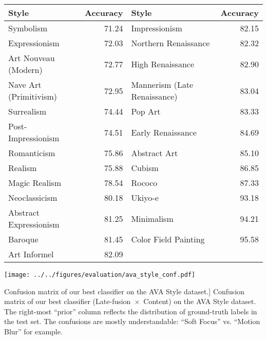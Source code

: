 \begin{table*}
\caption{
    Per-class accuracies on the Wikipaintings dataset, using the MC-bit feature.
}\label{tab:wp_accuracies}
\vspace{1em}
\centering
\begin{tabular}{lrlr}
\toprule
\textbf{Style} & \textbf{Accuracy} & \textbf{Style} & \textbf{Accuracy} \\
\midrule
Symbolism                    &         71.24 & Impressionism                &         82.15 \\
Expressionism                &         72.03 & Northern Renaissance         &         82.32 \\
Art Nouveau (Modern)         &         72.77 & High Renaissance             &         82.90 \\
Nave Art (Primitivism)       &         72.95 & Mannerism (Late Renaissance) &         83.04 \\
Surrealism                   &         74.44 & Pop Art                      &         83.33 \\
Post-Impressionism           &         74.51 & Early Renaissance            &         84.69 \\
Romanticism                  &         75.86 & Abstract Art                 &         85.10 \\
Realism                      &         75.88 & Cubism                       &         86.85 \\
Magic Realism                &         78.54 & Rococo                       &         87.33 \\
Neoclassicism                &         80.18 & Ukiyo-e                      &         93.18 \\
Abstract Expressionism       &         81.25 & Minimalism                   &         94.21 \\
Baroque                      &         81.45 & Color Field Painting         &         95.58 \\
Art Informel                 &         82.09 &                              &               \\
\bottomrule
\end{tabular}
\end{table*}

\begin{figure*}[h!]
\centering
\texttt{[image: ../../figures/evaluation/ava\_style\_conf.pdf]}
\caption
[Confusion matrix of our best classifier on the AVA Style dataset.]
{
Confusion matrix of our best classifier (\mbox{Late-fusion $\times$ Content}) on the AVA Style dataset.
The right-most ``prior'' column reflects the distribution of ground-truth labels in the test set.
The confusions are mostly understandable: ``Soft Focus'' vs. ``Motion Blur'' for example.
}
\label{fig:ava_style_conf}
\end{figure*}

